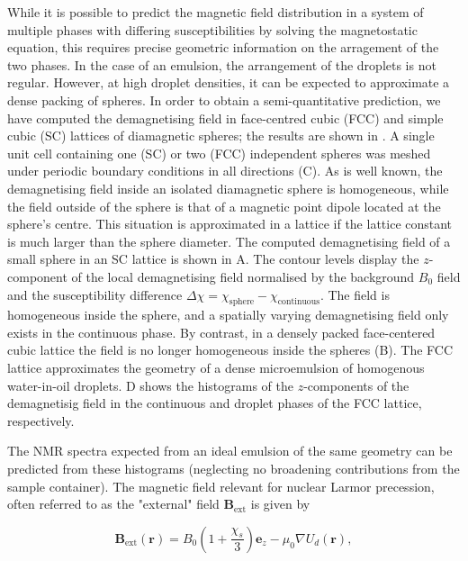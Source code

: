 While it is possible to predict the magnetic field distribution in a system of
multiple phases with differing susceptibilities by solving the magnetostatic
equation, this requires precise geometric information on the arragement of the
two phases. In the case of an emulsion, the arrangement of the droplets is not
regular. However, at high droplet densities, it can be
expected to approximate  a dense packing of spheres. In order to obtain a
semi-quantitative prediction, we have computed the demagnetising field in
face-centred cubic  (FCC) and simple cubic (SC) lattices of diamagnetic spheres;
the results are shown in  . A single unit cell containing
one (SC) or
two (FCC) independent spheres was meshed under periodic boundary conditions in all
directions (C).
As is well known, the demagnetising field inside an isolated diamagnetic sphere
is homogeneous, while the field outside of the
sphere is that of a magnetic
point dipole located at the sphere's centre. This situation is approximated
in a lattice if the lattice constant is much larger than the sphere
diameter. The computed demagnetising field
of a small sphere in an SC lattice is shown in A.
The contour levels display the $z$-component of the local demagnetising field
normalised by the background $B_0$ field and the susceptibility difference
$\Delta\chi= \chi_\text{sphere}-\chi_\text{continuous}$. The field is homogeneous
inside the sphere, and a spatially varying demagnetising field only
exists in the continuous phase.
By contrast, in a
densely packed face-centered cubic lattice the field is no
longer homogeneous inside the spheres (B). The FCC
lattice approximates the geometry of a dense microemulsion of homogenous
water-in-oil droplets.  D shows the histograms of
the $z$-components of
the demagnetisig field in the continuous and droplet phases of the FCC
lattice, respectively.

The NMR spectra expected from an ideal emulsion of the same geometry can
be predicted from these histograms
(neglecting no broadening contributions from the sample container).
The magnetic field relevant for nuclear Larmor precession, often referred
to as the "external" field\cite{Levitt:1996tg} $\mathbf{B}_\text{ext}$  is
given by\cite{Ryan:2014hl}

\begin{equation}
\mathbf{B}_\text{ext}(\mathbf{r})
= B_0 (1+\frac{\chi_s}{3}) \mathbf{e}_z  - {\mu_0} \nabla U_d(\mathbf{r}),
\end{equation}


